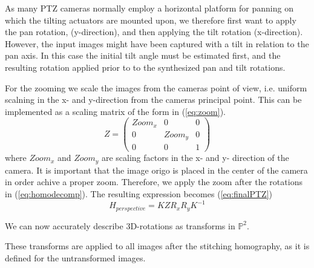 As many PTZ cameras normally employ a horizontal platform for panning on which the tilting actuators are mounted upon, we therefore first want to apply the pan rotation, (y-direction), and then applying the tilt rotation (x-direction).
However, the input images might have been captured with a tilt in relation to the pan axis.
In this case the initial tilt angle must be estimated first, and the resulting rotation applied prior to to the synthesized pan and tilt rotations.

	For the zooming we scale the images from the cameras point of view, i.e. uniform scalning in the x- and y-direction from the cameras principal point.
	This can be implemented as a scaling matrix of the form in (\ref{eq:zoom}).
	\begin{equation}
		Z=\begin{pmatrix}
			Zoom_x & 0 & 0 \\
			0 & Zoom_y & 0 \\
			0 & 0 & 1
		\end{pmatrix}
		\label{eq:zoom}
	\end{equation}
	where $Zoom_x$ and $Zoom_y$ are scaling factors in the x- and y- direction of the camera.
	It is important that the image origo is placed in the center of the camera in order achive a proper zoom.
	Therefore, we apply the zoom after the rotations in (\ref{eq:homodecomp}). The resulting expression becomes (\ref{eq:finalPTZ})
	\begin{equation}
		H_{perspective}=K Z  R_{x}R_{y}  K^{-1}
		\label{eq:finalPTZ}
	\end{equation}

	We can now accurately describe 3D-rotations as transforms in $\mathbb{P}^2$.

These transforms are applied to all images after the stitching homography, as it is defined for the untransformed images.
